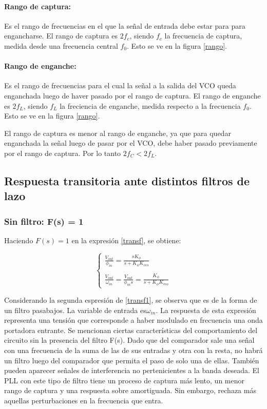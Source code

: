 	\paragraph{Rango de captura:} Es el rango de frecuencias en el que la señal de entrada debe estar para para engancharse. El rango de captura es $2f_c$, siendo $f_c$ la frecuencia de captura, medida desde una frecuencia central $f_0$. Esto se ve en la figura \ref{rango}.

	\paragraph{Rango de enganche:} Es el rango de frecuencias para el cual la señal a la salida del VCO queda enganchada luego de haver pasado por el rango de captura. El rango de enganche es $2f_L$, siendo $f_L$ la freciencia de enganche, medida respecto a la frecuencia $f_0$. Esto se ve en la figura \ref{rango}.
	
	El rango de captura es menor al rango de enganche, ya que para quedar enganchada la señal luego de pasar por el VCO, debe haber pasado previamente por el rango de captura. Por lo tanto $2f_C<2f_L$.

\subsection{Respuesta transitoria ante distintos filtros de lazo}

	\subsubsection{Sin filtro: F(s) = 1 }
	Haciendo $F(s) = 1$ en la expresi\'on \ref{transf}, se obtiene:
	
\begin{equation}
\begin{cases}
\frac{V_{out}}{\phi_{in}} = \frac{sK_{\phi}}{s+K_{\phi}K_{vco}}\\ \\
\frac{V_{out}}{\omega_{in}}=\frac{V_{out}}{\phi_{in}s} = \frac{K_{\phi}}{s+K_{\phi}K_{vco}}
\end{cases}
\label{transf1}
\end{equation}

Considerando la segunda espresi\'on de \ref{transf1}, se observa que es de la forma de un filtro pasabajos. La variable de entrada es$\omega_{in}$. La respuesta de esta expresi\'on representa una tensi\'on que corresponde a haber modulado en frecuencia una onda portadora entrante.
Se mencionan ciertas caracter\'isticas del comportamiento del circuito sin la presencia del filtro F(s). Dado que del comparador sale una señal con una frecuencia de la suma de las de sus entradas y otra con la resta, no habr\'a un filtro luego del comparador que permita el paso de solo una de ellas. Tambi\'en pueden aparecer señales de interferencia no pertenicientes a la banda deseada. El PLL con este tipo de filtro tiene un proceso de captura m\'as lento, un menor rango de captura y una respuesta sobre amortiguada. Sin embargo, rechaza m\'as aquellas perturbaciones en la frecuencia que entra.
		
